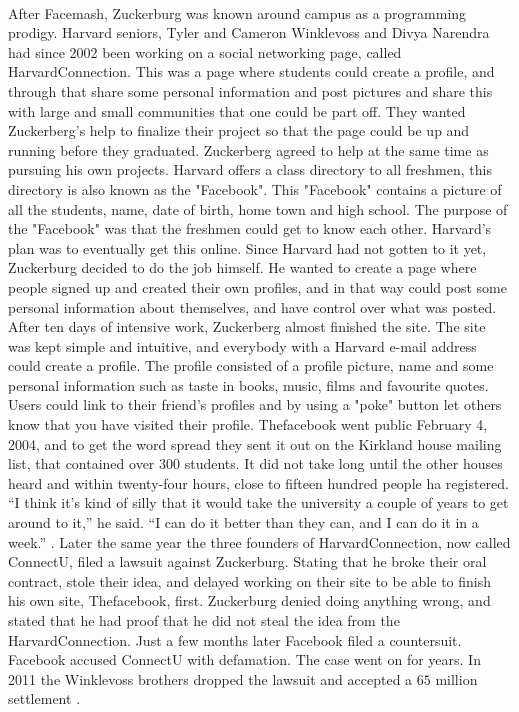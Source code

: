\paragraph{}
After Facemash, Zuckerburg was known around campus as a programming prodigy. Harvard seniors, Tyler and Cameron Winklevoss and Divya Narendra had since 2002 been working on a social networking page, called HarvardConnection. This was a page where students could create a profile, and through that share some personal information and post pictures and share this with large and small communities that one could be part off. They wanted Zuckerberg's help to finalize their project so that the page could be up and running before they graduated. Zuckerberg agreed to help at the same time as pursuing his own projects. Harvard offers a class directory to all freshmen, this directory is also known as the "Facebook". This "Facebook" contains a picture of all the students, name, date of birth, home town and high school. The purpose of the "Facebook" was that the freshmen could get to know each other. Harvard's plan was to eventually get this online. Since Harvard had not gotten to it yet,  Zuckerburg decided to do the job himself. He wanted to create a page where people signed up and created their own profiles, and in that way could post some personal information about themselves, and have control over what was posted. After ten days of intensive work, Zuckerberg almost finished the site. The site was kept simple and intuitive, and everybody with a Harvard e-mail address could create a profile. The profile consisted of a profile picture, name and some personal information such as taste in books, music, films and favourite quotes. Users could link to their friend's profiles and by using a "poke" button let others know that you have visited their profile. Thefacebook went public February 4, 2004, and to get the word spread they sent it out on the Kirkland house mailing list, that contained over 300 students. It did not take long until the other houses heard and within twenty-four hours, close to fifteen hundred people ha registered. “I think it’s kind of silly that it would take the university a couple of years to get around to it,” he said. “I can do it better than they can, and I can do it in a week.” \cite{MeMedia}. Later the same year the three founders of HarvardConnection, now called ConnectU, filed a lawsuit against Zuckerburg. Stating that he broke their oral contract, stole their idea, and delayed working on their site to be able to finish his own site, Thefacebook, first. Zuckerburg denied doing anything wrong, and stated that he had proof that he did not steal the idea from the HarvardConnection. Just a few months later Facebook filed a countersuit. Facebook accused ConnectU with defamation. The case went on for years. In 2011 the Winklevoss brothers dropped the lawsuit and accepted a $ 65 $ million settlement \cite{droppLawsuit}.


